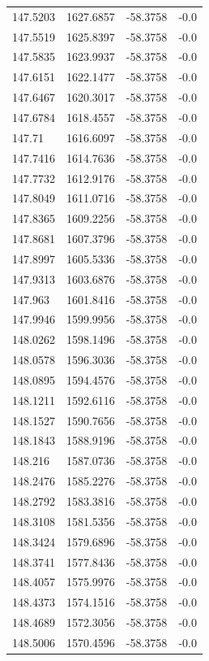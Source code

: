 \begin{table}[H]
\begin{tabular}{llll}
147.5203 & 1627.6857 & -58.3758 & -0.0 \\
147.5519 & 1625.8397 & -58.3758 & -0.0 \\
147.5835 & 1623.9937 & -58.3758 & -0.0 \\
147.6151 & 1622.1477 & -58.3758 & -0.0 \\
147.6467 & 1620.3017 & -58.3758 & -0.0 \\
147.6784 & 1618.4557 & -58.3758 & -0.0 \\
147.71 & 1616.6097 & -58.3758 & -0.0 \\
147.7416 & 1614.7636 & -58.3758 & -0.0 \\
147.7732 & 1612.9176 & -58.3758 & -0.0 \\
147.8049 & 1611.0716 & -58.3758 & -0.0 \\
147.8365 & 1609.2256 & -58.3758 & -0.0 \\
147.8681 & 1607.3796 & -58.3758 & -0.0 \\
147.8997 & 1605.5336 & -58.3758 & -0.0 \\
147.9313 & 1603.6876 & -58.3758 & -0.0 \\
147.963 & 1601.8416 & -58.3758 & -0.0 \\
147.9946 & 1599.9956 & -58.3758 & -0.0 \\
148.0262 & 1598.1496 & -58.3758 & -0.0 \\
148.0578 & 1596.3036 & -58.3758 & -0.0 \\
148.0895 & 1594.4576 & -58.3758 & -0.0 \\
148.1211 & 1592.6116 & -58.3758 & -0.0 \\
148.1527 & 1590.7656 & -58.3758 & -0.0 \\
148.1843 & 1588.9196 & -58.3758 & -0.0 \\
148.216 & 1587.0736 & -58.3758 & -0.0 \\
148.2476 & 1585.2276 & -58.3758 & -0.0 \\
148.2792 & 1583.3816 & -58.3758 & -0.0 \\
148.3108 & 1581.5356 & -58.3758 & -0.0 \\
148.3424 & 1579.6896 & -58.3758 & -0.0 \\
148.3741 & 1577.8436 & -58.3758 & -0.0 \\
148.4057 & 1575.9976 & -58.3758 & -0.0 \\
148.4373 & 1574.1516 & -58.3758 & -0.0 \\
148.4689 & 1572.3056 & -58.3758 & -0.0 \\
148.5006 & 1570.4596 & -58.3758 & -0.0 \\

\end{tabular}
\end{table}
